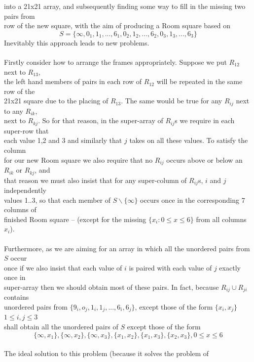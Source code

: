 \documentclass[
  12pt,
  a4paper]{book}
\begin{document}
into a 21x21 array, and subsequently finding some way to fill in the
missing two pairs from\\
row of the new square, with the aim of producing a Room square based on
\[S = \{\infty,0_1,1_1,...,6_1,0_2,1_2,...,6_2,0_3,1_3,...,6_3\}\]
Inevitably this approach leads to new problems.\\
~\\
Firstly consider how to arrange the frames appropriately. Suppose we put
\(R_{12}\) next to \(R_{13}\),\\
the left hand members of pairs in each row of \(R_{12}\) will be
repeated in the same row of the\\
21x21 square due to the placing of \(R_{13}\). The same would be true
for any \(R_{ij}\) next to any \(R_{ik}\),\\
next to \(R_{kj}\). So for that reason, in the super-array of
\(R_{ij}\)s we require in each super-row that\\
each value 1,2 and 3 and similarly that \(j\) takes on all these values.
To satisfy the column\\
for our new Room square we also require that no \(R_{ij}\) occurs above
or below an \(R_{ik}\) or \(R_{kj}\), and\\
that reason we must also insist that for any super-column of
\(R_{ij}\)s, \(i\) and \(j\) independently\\
values 1..3, so that each member of \(S \backslash \{\infty\}\) occurs
once in the corresponding 7 columns of\\
finished Room square -- (except for the missing
\(\{x_i: 0 \leq x \leq 6\}\) from all columns \(x_i\)).\\
~\\
Furthermore, as we are aiming for an array in which all the unordered
pairs from \(S\) occur\\
once if we also insist that each value of \(i\) is paired with each
value of \(j\) exactly once in\\
super-array then we should obtain most of these pairs. In fact, because
\(R_{ij} \cup R_{ji}\) contains\\
unordered pairs from \(\{9_i,o_j,1_i,1_j,...,6_i,6_j\}\), except those
of the form \(\{x_i,x_j\}\) \(1 \leq i,j \leq 3\)\\
shall obtain all the unordered pairs of \(S\) except those of the form
\[\{\infty,x_1\},\{\infty,x_2\},\{\infty,x_3\},\{x_1,x_2\},\{x_1,x_3\},\{x_2,x_3\}, 0 \leq x \leq 6\]\\
The ideal solution to this problem (because it solves the problem of
\end{document}

